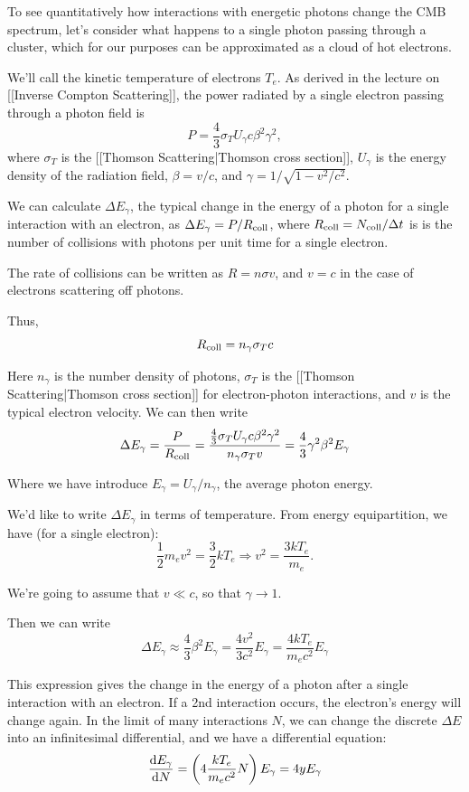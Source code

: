 \documentclass{article}
\begin{document}
To see quantitatively how interactions with energetic photons change the CMB spectrum, let's consider what happens to a single photon passing through a cluster, which for our purposes can be approximated as a cloud of hot electrons. 

We'll call the kinetic temperature of electrons $T_{e}$. As derived in the lecture on [[Inverse Compton Scattering]], the power radiated by a single electron passing through a photon field is $$P=\frac{4}{3}\sigma_{T}U_{\gamma}c\beta^{2}\gamma^{2},$$
where $\sigma_{T}$ is the [[Thomson Scattering|Thomson cross section]], $U_{\gamma}$ is the energy density of the radiation field, $\beta=v/c$, and $\gamma = 1/\sqrt{1-v^2/c^2}$. 

We can calculate $\Delta E_{\gamma}$, the typical change in the energy of a photon for a single interaction with an electron, as $\Delta E_{\gamma}=P/R_{{\rm coll}}$, where $R_{{\rm coll}}=N_{{\rm coll}}/\Delta t$ is is the number of collisions with photons per unit time for a single electron. 

The rate of collisions can be written as $R=n\sigma v$, and $v=c$ in the case of electrons scattering off photons.
 
Thus, $$R_{{\rm coll}}=n_{\gamma}\sigma_{T}c$$

 Here $n_{\gamma}$ is the number density of photons, $\sigma_{T}$ is the [[Thomson Scattering|Thomson cross section]] for electron-photon interactions, and $v$ is the typical electron velocity. We can then write $$\Delta E_{\gamma}=\frac{P}{R_{{\rm coll}}}=\frac{\frac{4}{3}\sigma_{T}U_{\gamma}c\beta^{2}\gamma^{2}}{n_{\gamma}\sigma_{T}v}=\frac{4}{3}\gamma^{2}\beta^{2}E_{\gamma}$$ 

Where we have introduce $E_{\gamma}=U_{\gamma}/n_{\gamma}$, the average photon energy. 

We'd like to write $\Delta E_{\gamma}$ in terms of temperature. From energy equipartition, we have (for a single electron): $$\frac{1}{2}m_{e}v^{2}=\frac{3}{2}kT_{e}\Rightarrow v^{2}=\frac{3kT_{e}}{m_{e}}.$$

We're going to assume that $v\ll c$, so that $\gamma\to1$.
  
Then we can write $$\Delta E_{\gamma}\approx\frac{4}{3}\beta^{2}E_{\gamma}=\frac{4v^{2}}{3c^{2}}E_{\gamma}=\frac{4kT_{e}}{m_{e}c^{2}}E_{\gamma}$$
 
This expression gives the change in the energy of a photon after a single interaction with an electron. If a 2nd interaction occurs, the electron's energy will change again. In the limit of many interactions $N$, we can change the discrete $\Delta E$ into an infinitesimal differential, and we have a differential equation: $$\frac{{\rm d}E_{\gamma}}{{\rm d}N}=\left(4\frac{kT_{e}}{m_{e}c^{2}}N\right)E_{\gamma}=4yE_{\gamma}$$
\end{document}
